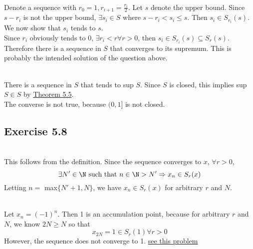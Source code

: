 \begin{solution}
 \\Denote a sequence with $r_0 = 1, r_{i+1} = \frac{r_i}{2}$. Let $s$ denote the upper bound. Since $s - r_i$ is not the upper bound, $\exists s_i \in S$ where $s - r_i < s_i \leq s$. Then $s_i \in S_{r_i}(s)$. We now show that $s_i$ tends to $s$. \\
 Since $r_i$ obviously tends to 0, $\exists r_i < r \forall r > 0$, then $s_i \in S_{r_i}(s) \subseteq S_r(s)$. Therefore there is a sequence in $S$ that converges to its supremum. This is probably the intended solution of the question above.
\end{solution}


\begin{solution}
\\ There is a sequence in $S$ that tends to sup $S$. Since $S$ is closed, this implies sup $S \in S$ by \hyperref[thm3.5.5]{Theorem 5.5}. \\
The converse is not true, because $(0,1]$ is not closed.
\end{solution}

\subsection{Exercise 5.8}
\setcounter{question}{0}


\begin{solution}
 \\This follows from the definition. Since the sequence converges to $x$, $\forall r > 0$,
 $$\exists N' \in \N \text{ such that } n \in \N > N' \Rightarrow x_n \in S_r(x)$$
Letting $n =$ max$\{N'+1,N\}$, we have $x_n \in S_r(x)$ for arbitrary $r$ and $N$.
\end{solution}


\begin{solution}
 \\Let $x_n = (-1)^n$. Then 1 is an accumulation point, because for arbitrary $r$ and $N$, we know $2N \geq N$ so that
 $$x_{2N} = 1 \in S_r(1) \forall r > 0$$
 However, the sequence does not converge to 1. \hyperref[alternatingsign]{see this problem}
\end{solution}

